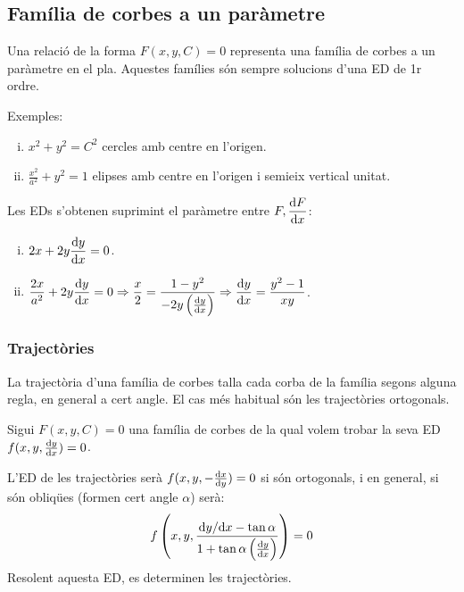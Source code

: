 \subsection{Família de corbes a un paràmetre}
\begin{defi}
Una relació de la forma $F(x,y,C) = 0$ representa una família de corbes a un paràmetre en el pla.
Aquestes famílies són sempre solucions d'una ED de 1r ordre.
\end{defi}
Exemples:
\begin{enumerate}[i)]
    \item $\displaystyle  x^{2} + y^{2} = C^{2}$ cercles amb centre en l'origen.
    \item $\displaystyle \frac{x^{2}}{a^{2}} + y^{2} = 1$ elipses amb centre en l'origen i semieix vertical unitat.
\end{enumerate}
Les EDs s'obtenen suprimint el paràmetre entre $\displaystyle F, \frac{\mathrm{d} F}{\mathrm{d} x}$:
\begin{enumerate}[i)]
	\item $2x + 2y \displaystyle \frac{\mathrm{d} y}{\mathrm{d} x} = 0$.
	\item $\displaystyle \frac{2x}{a^{2}} + 2y \frac{\mathrm{d} y}{\mathrm{d} x} = 0 \Rightarrow \frac{x}{2} = \frac{1 - y^{2}}{-2 y \left( \frac{\mathrm{d} y}{\mathrm{d} x} \right)} \Rightarrow \frac{\mathrm{d} y}{\mathrm{d} x} = \frac{y^{2} - 1}{x y}$.
\end{enumerate}

\subsubsection*{Trajectòries}
\begin{defi}
La trajectòria d'una família de corbes talla cada corba de la família segons alguna regla, en general a cert angle. El cas més habitual són les trajectòries ortogonals.
\end{defi}
Sigui $F(x, y, C) = 0$ una família de corbes de la qual volem trobar la seva ED $f(x, y, \frac{\mathrm{d} y}{\mathrm{d} x}) = 0$.

L'ED de les trajectòries serà $f(x, y, - \frac{\mathrm{d} x}{\mathrm{d} y}) = 0$ si són ortogonals, i en general, si són obliqües (formen cert angle $\alpha$) serà:
\begin{align}
	f\left(x, y, \frac{\mathrm{d} y / \mathrm{d} x - \tan{\alpha}}{1 + \tan{\alpha} \left( \frac{\mathrm{d} y}{\mathrm{d} x} \right)}\right) = 0
\end{align}
Resolent aquesta ED, es determinen les trajectòries.

